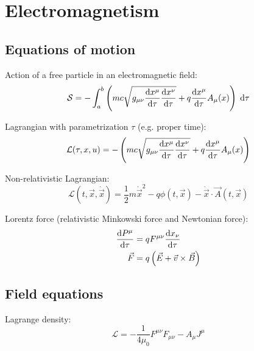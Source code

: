 \section{Electromagnetism}
	\subsection{Equations of motion}
		\noindent
		Action of a free particle in an electromagnetic field:%
		\begin{equation}
			\mathcal{S}=-\int_{a}^{b}\left(mc\sqrt{g_{\mu\nu}\frac{\mathrm{d} x^\mu}{\mathrm{d} \tau}\frac{\mathrm{d} x^\nu}{\mathrm{d} \tau}}
	+ q\frac{\mathrm{d} x^\mu}{\mathrm{d} \tau}A_\mu(x)\right)\;\mathrm{d}\tau
		\end{equation}

		\noindent
		Lagrangian with parametrization $\tau$ (e.g. proper time):%
		\begin{equation}
			\mathcal{L} (\tau,x,u) =-\left(mc\sqrt{g_{\mu\nu}\frac{\mathrm{d} x^\mu}{\mathrm{d} \tau}\frac{\mathrm{d} x^\nu}{\mathrm{d} \tau}}
			+ q\frac{\mathrm{d} x^\mu}{\mathrm{d} \tau}A_\mu(x)\right)
		\end{equation}

		\noindent
		Non-relativistic Lagrangian:%
		\begin{equation}
			\mathcal{L}(t,\vec{x},\dot{\vec{x}}) = \frac{1}{2}m\dot{\vec{x}}^2 - q\phi(t,\vec{x}) - \dot{\vec{x}}\cdot\vec{A}(t,\vec{x})
		\end{equation}

		\noindent
		Lorentz force (relativistic Minkowski force and Newtonian force):
		\begin{equation}
			\begin{aligned}
				\frac{\mathrm{d} P^\mu}{\mathrm{d} \tau} &= q F^{\mu\nu}\frac{\mathrm{d} x_\nu}{\mathrm{d} \tau} \\
				\vec{F} &= q\left(\vec{E}+\vec{v}\times\vec{B}\right) \\
			\end{aligned}
		\end{equation}

	\subsection{Field equations}
		\noindent
		Lagrange density:
		\begin{equation}
			\mathcal{L} = -\frac{1}{4\mu_0}F^{\mu\nu} F_{\mu\nu} - A_\mu J^\mu
		\end{equation}

